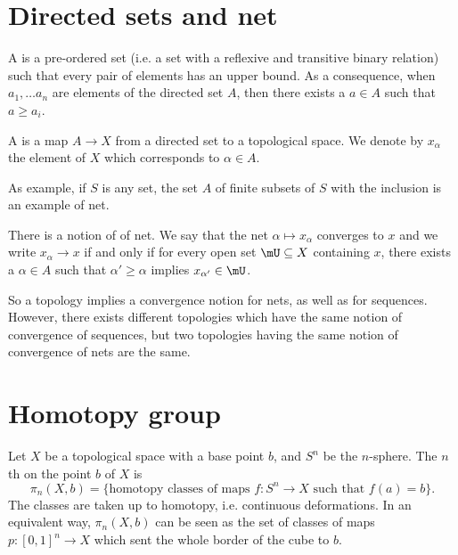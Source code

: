 
\section{Directed sets and net}

A  is a pre-ordered set (i.e. a set with a reflexive and transitive binary relation) such that every pair of elements has an upper bound. As a consequence, when $a_1,\ldots a_n$ are elements of the directed set $A$, then there exists a $a\in A$ such that $a\geq a_i$.

A  is a map $A\to X$ from a directed set to a topological space. We denote by $x_{\alpha}$ the element of $X$ which corresponds to $\alpha\in A$.

As example, if $S$ is any set, the set $A$ of finite subsets of $S$ with the inclusion is an example of net.

There is a notion of  of net. We say that the net $\alpha\mapsto x_\alpha$ converges to $x$ and we write $x_{\alpha}\to x$ if and only if for every open set $\mU\subseteq X$ containing $x$, there exists a $\alpha\in A$ such that $\alpha'\geq \alpha$ implies $x_{\alpha'}\in\mU$.

So a topology implies a convergence notion for nets, as well as for sequences. However, there exists different topologies which have the same notion of convergence of sequences, but two topologies having the same notion of convergence of nets are the same.


\section{Homotopy group}

Let $X$ be a topological space with a base point $b$, and $S^n$ be the $n$-sphere. The $n$th  on the point $b$ of $X$ is
\begin{equation}
    \pi_n(X,b)=\{ \text{homotopy classes of maps }f\colon S^n\to X \text{ such that } f(a)=b \}.
\end{equation}
The classes are taken up to homotopy, i.e. continuous deformations. In an equivalent way, $\pi_n(X,b)$ can be seen as the set of classes of maps $p\colon [0,1]^n\to X$ which sent the whole border of the cube to $b$.

